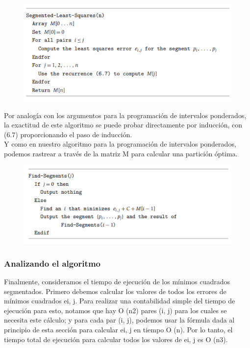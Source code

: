 \documentclass[a4paper, 12pt]{book}
\theoremstyle{dotless}
\begin{document}
\begin{figure}[h]
\centering
\includegraphics[scale=1]{Imagenes-Seccion6/cod6_5.PNG}
\end{figure}

Por analogía con los argumentos para la programación de intervalos ponderados, la exactitud de este algoritmo se puede probar directamente por inducción, con (6.7) proporcionando el paso de inducción.\\

Y como en nuestro algoritmo para la programación de intervalos ponderados, podemos rastrear a través de la matriz M para calcular una partición óptima.\\

\begin{figure}[h]
\centering
\includegraphics[scale=1]{Imagenes-Seccion6/cod6_6.PNG}
\end{figure}

\subsubsection*{Analizando el algoritmo}

Finalmente, consideramos el tiempo de ejecución de los mínimos cuadrados segmentados. Primero debemos calcular los valores de todos los errores de mínimos cuadrados ei, j. Para realizar una contabilidad simple del tiempo de ejecución para esto, notamos que hay O (n2) pares (i, j) para los cuales se necesita este cálculo; y para cada par (i, j), podemos usar la fórmula dada al principio de esta sección para calcular ei, j en tiempo O (n). Por lo tanto, el tiempo total de ejecución para calcular todos los valores de ei, j es O (n3).\\
\end{document}
